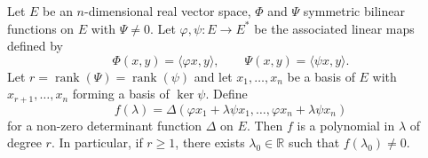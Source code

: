 Let $E$ be an $n$-dimensional real vector space, $\Phi$ and $\Psi$ symmetric bilinear functions on $E$ with $\Psi \neq 0$. Let $\varphi, \psi : E \to E^*$ be the associated linear maps defined by
$$\Phi(x, y) = \langle \varphi x, y \rangle, \qquad \Psi(x, y) = \langle \psi x, y \rangle.$$
Let $r = \operatorname{rank}(\Psi) = \operatorname{rank}(\psi)$ and let $x_1, \ldots, x_n$ be a basis of $E$ with $x_{r+1}, \ldots, x_n$ forming a basis of $\ker \psi$. Define
$$f(\lambda) = \Delta(\varphi x_1 + \lambda \psi x_1, \ldots, \varphi x_n + \lambda \psi x_n)$$
for a non-zero determinant function $\Delta$ on $E$. Then $f$ is a polynomial in $\lambda$ of degree $r$. In particular, if $r \geq 1$, there exists $\lambda_0 \in \mathbb{R}$ such that $f(\lambda_0) \neq 0$.
